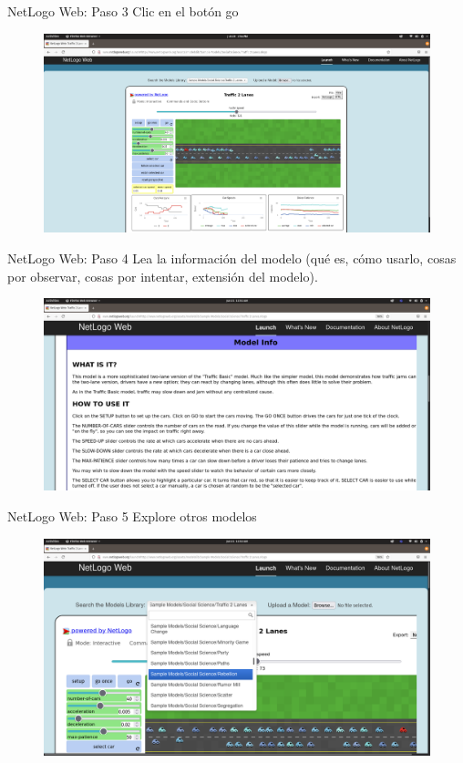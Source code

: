 \documentclass{beamer}
\begin{document}
\begin{frame}{NetLogo Web: Paso 3}
Clic en el botón go
\begin{figure}
\centering
\includegraphics[width=.92\textwidth]{NetLogoWC.png}
\end{figure}  
\end{frame}

\begin{frame}{NetLogo Web: Paso 4}
Lea la información del modelo (qué es, cómo usarlo, cosas por observar, cosas por intentar, extensión del modelo).
\begin{figure}
\centering
\includegraphics[width=.92\textwidth]{NetlogoC.png}
\end{figure}  
\end{frame}

\begin{frame}{NetLogo Web: Paso 5}
Explore otros modelos
\begin{figure}
\centering
\includegraphics[width=.92\textwidth]{NetlogoD.png}
\end{figure}  
\end{frame}
\end{document}
